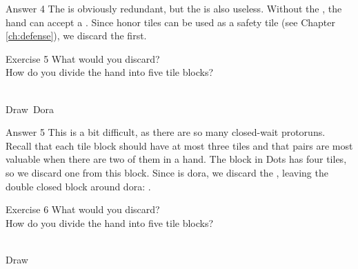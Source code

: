 \newpage

\begin{itembox}[r]{Answer 4}
\emj
The {\large\bei} is obviously redundant, but the {\large{}} is also useless. Without the {\large{}}, the hand can accept a {\large{}}. Since honor tiles can be used as a safety tile (see Chapter \ref{ch:defense}), we discard the {\large{}} first. 
\end{itembox}

\vfill


\begin{itembox}[l]{Exercise 5}
What would you discard? \\
\vsp
How do you divide the hand into five tile blocks? 

\bp
{}~~\\
\hspace{283pt}\footnotesize{Draw}~\footnotesize{{\jap Dora}}
\ep
\end{itembox}

\newpage

\begin{itembox}[r]{Answer 5}
\emj
This is a bit difficult, as there are so many closed-wait protoruns. Recall that each tile block should have at most three tiles and that pairs are most valuable when there are two of them in a hand. 
The block in Dots has four tiles, so we discard one from this block. Since {\large{}} is {\jap dora}, we discard the {\large{}}, leaving the double closed block around {\jap dora}: {\large{}}. 
\end{itembox}

\vfill

\begin{itembox}[l]{Exercise 6}
What would you discard? \\
\vsp
How do you divide the hand into five tile blocks? 

\bp
{}~\\
\hspace{290pt}\footnotesize{Draw}
\ep
\end{itembox}

